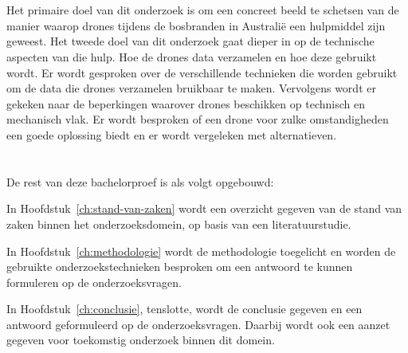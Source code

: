 \section{}
\label{sec:onderzoeksdoelstelling}

Het primaire doel van dit onderzoek is om een concreet beeld te schetsen van de manier waarop drones tijdens de bosbranden in Australië een hulpmiddel zijn geweest. Het tweede doel van dit onderzoek gaat dieper in op de technische aspecten van die hulp. Hoe de drones data verzamelen en hoe deze gebruikt wordt. Er wordt gesproken over de verschillende technieken die worden gebruikt om de data die drones verzamelen bruikbaar te maken. Vervolgens wordt er gekeken naar de beperkingen waarover drones beschikken op technisch en mechanisch vlak. Er wordt besproken of een drone voor zulke omstandigheden een goede oplossing biedt en er wordt vergeleken met alternatieven.

\section{}
\label{sec:opzet-bachelorproef}


De rest van deze bachelorproef is als volgt opgebouwd:

In Hoofdstuk~\ref{ch:stand-van-zaken} wordt een overzicht gegeven van de stand van zaken binnen het onderzoeksdomein, op basis van een literatuurstudie.

In Hoofdstuk~\ref{ch:methodologie} wordt de methodologie toegelicht en worden de gebruikte onderzoekstechnieken besproken om een antwoord te kunnen formuleren op de onderzoeksvragen.


In Hoofdstuk~\ref{ch:conclusie}, tenslotte, wordt de conclusie gegeven en een antwoord geformuleerd op de onderzoeksvragen. Daarbij wordt ook een aanzet gegeven voor toekomstig onderzoek binnen dit domein.